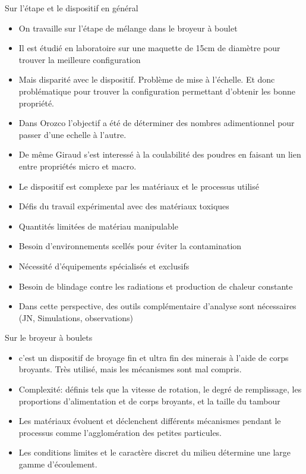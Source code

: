 Sur l'étape et le dispositif en général
\begin{itemize}
    \item On travaille sur l'étape de mélange dans le broyeur à boulet
    \item Il est étudié en laboratoire sur une maquette de 15cm de diamètre pour trouver la meilleure configuration
    \item Mais disparité avec le dispositif. Problème de mise à l'échelle. Et donc problématique pour trouver la configuration permettant d'obtenir les bonne propriété.
    \item Dans Orozco l'objectif a été de déterminer des nombres adimentionnel pour passer d'une echelle à l'autre.
    \item De même Giraud s'est interessé à la coulabilité des poudres en faisant un lien entre propriétés micro et macro.
    \item Le dispositif est complexe par les matériaux et le processus utilisé
    \item Défis du travail expérimental avec des matériaux toxiques
    \item Quantités limitées de matériau manipulable
    \item Besoin d'environnements scellés pour éviter la contamination
    \item Nécessité d'équipements spécialisés et exclusifs
    \item Besoin de blindage contre les radiations et production de chaleur constante
    \item Dans cette perspective, des outils complémentaire d'analyse sont nécessaires (JN, Simulations, observations)
\end{itemize}

Sur le broyeur à boulets

\begin{itemize}
    \item c'est un dispositif de broyage fin et ultra fin des minerais à l'aide de corps broyants. Très utilisé, mais les mécanismes sont mal compris.
    \item Complexité:  définis tels que la vitesse de rotation, le degré de remplissage, les proportions d'alimentation et de corps broyants, et la taille du tambour
    \item Les matériaux évoluent et déclenchent différents mécanismes pendant le processus comme l'agglomération des petites particules.
    \item Les conditions limites et le caractère discret du milieu détermine une large gamme d'écoulement.
\end{itemize}

